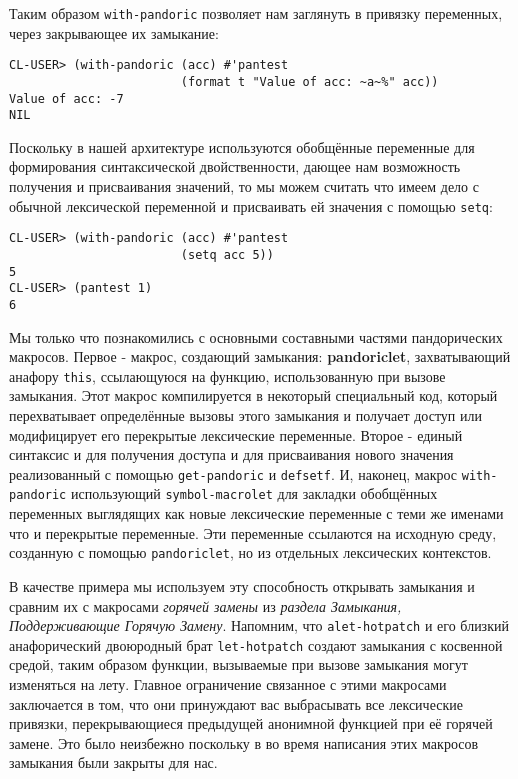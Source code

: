 Таким образом \verb"with-pandoric" позволяет нам заглянуть в привязку переменных, через закрывающее их замыкание:

\begin{verbatim}
CL-USER> (with-pandoric (acc) #'pantest
                        (format t "Value of acc: ~a~%" acc))
Value of acc: -7
NIL
\end{verbatim}

Поскольку в нашей архитектуре используются обобщённые переменные для формирования синтаксической двойственности, дающее нам возможность получения и присваивания значений, то мы можем считать что имеем дело с обычной лексической переменной и присваивать ей значения с помощью \verb"setq":

\begin{verbatim}
CL-USER> (with-pandoric (acc) #'pantest
                        (setq acc 5))
5
CL-USER> (pantest 1)
6
\end{verbatim}

Мы только что познакомились с основными составными частями пандорических макросов. Первое - макрос, создающий замыкания: {\Eng\textbf{pandoriclet}}, захватывающий анафору \verb"this", ссылающуюся на функцию, использованную при вызове замыкания. Этот макрос компилируется в некоторый специальный код, который перехватывает определённые вызовы этого замыкания и получает доступ или модифицирует его перекрытые лексические переменные. Второе - единый синтаксис и для получения доступа и для присваивания нового значения реализованный с помощью \verb"get-pandoric" и \verb"defsetf". И, наконец, макрос \verb"with-pandoric" использующий \verb"symbol-macrolet" для закладки обобщённых переменных выглядящих как новые лексические переменные с теми же именами что и перекрытые переменные. Эти переменные ссылаются на исходную среду, созданную с помощью \verb"pandoriclet", но из отдельных лексических контекстов.

В качестве примера мы используем эту способность открывать замыкания и сравним их с макросами \emph{горячей замены} из \emph{раздела Замыкания, Поддерживающие Горячую Замену}. Напомним, что \verb"alet-hotpatch" и его близкий анафорический двоюродный брат \verb"let-hotpatch" создают замыкания с косвенной средой, таким образом функции, вызываемые при вызове замыкания могут изменяться на лету. Главное ограничение связанное с этими макросами заключается в том, что они принуждают вас выбрасывать все лексические привязки, перекрывающиеся предыдущей анонимной функцией при её горячей замене. Это было неизбежно поскольку в во время написания этих макросов замыкания были закрыты для нас.


